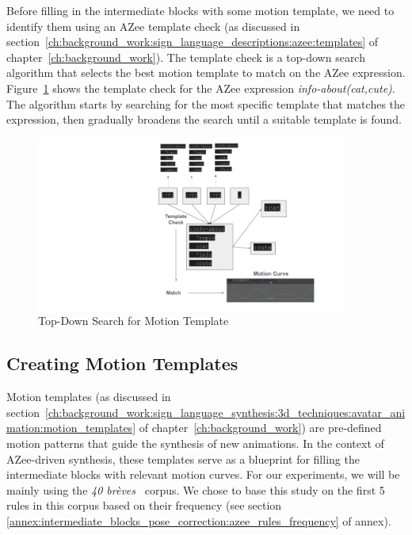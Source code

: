\documentclass[../../main.tex]{subfiles}
\begin{document}
Before filling in the intermediate blocks with some motion template, we need to identify them using an AZee template check (as discussed in section~\ref{ch:background_work:sign_language_descriptions:azee:templates} of chapter~\ref{ch:background_work}). The template check is a top-down search algorithm that selects the best motion template to match on the AZee expression. Figure~\ref{fig:top_down_search_template} shows the template check for the AZee expression \emph{info-about(cat,cute)}. The algorithm starts by searching for the most specific template that matches the expression, then gradually broadens the search until a suitable template is found.

\begin{figure}
    \centering \includegraphics[width = 4in]{chapters/intermediate_blocks_pose_correction/images/top_down_search_template.png}
    \caption{Top-Down Search for Motion Template}
    \label{fig:top_down_search_template}
\end{figure}

\subsection{Creating Motion Templates}
\label{ch:intermediate_blocks_pose_correction:creating_motion_templates}

Motion templates (as discussed in section~\ref{ch:background_work:sign_language_synthesis:3d_techniques:avatar_animation:motion_templates} of chapter~\ref{ch:background_work}) are pre-defined motion patterns that guide the synthesis of new animations. In the context of AZee-driven synthesis, these templates serve as a blueprint for filling the intermediate blocks with relevant motion curves. For our experiments, we will be mainly using the \emph{40 brèves}~\cite{challant2022first} corpus. We chose to base this study on the first 5 rules in this corpus based on their frequency (see section  \ref{annex:intermediate_blocks_pose_correction:azee_rules_frequency} of annex).
\end{document}
